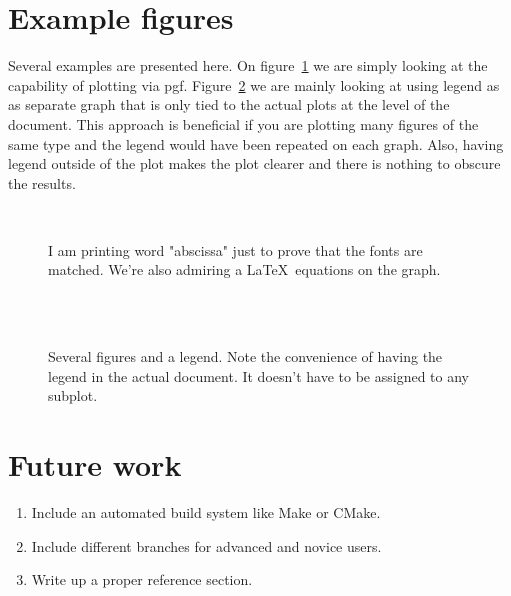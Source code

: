 \documentclass[a4paper,12pt]{article}
\begin{document}
\section{Example figures}

Several examples are presented here. On figure~\ref{fig:latex} we are simply
looking at the capability of plotting via pgf. Figure~\ref{fig:several} we are
mainly looking at using legend as as separate graph that is only tied to the
actual plots at the level of the document. This approach is beneficial if you
are plotting many figures of the same type and the legend would have been
repeated on each graph. Also, having legend outside of the plot makes the plot
clearer and there is nothing to obscure the results.


\begin{figure}[t]
  \centering
  
  \\
  \caption{I am printing word "abscissa" just to prove that the fonts are
  matched. We're also admiring a \LaTeX\ equations on the graph.}
  \label{fig:latex}
\end{figure}
\begin{figure}[p]
  \begin{center}
    
    
    \\
    
    
    \\
    
  \end{center}
  \caption{Several figures and a legend. Note the convenience of having the
  legend in the actual document. It doesn't have to be assigned to any subplot.}
  \label{fig:several}
\end{figure}

\section{Future work}
\begin{enumerate}
  \item Include an automated build system like Make or CMake.
  \item Include different branches for advanced and novice users.
  \item Write up a proper reference section.
\end{enumerate}
\end{document}
